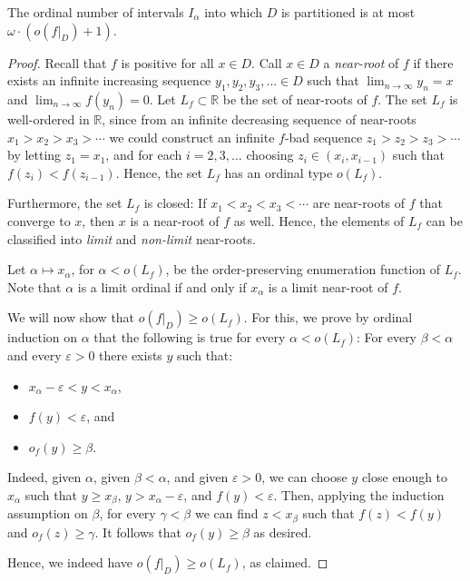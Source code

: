 \documentclass[10pt,a4paper]{amsart}
\begin{document}
\begin{Lemma}\label{lem_num_intervals}
    The ordinal number of intervals $I_\alpha$ into which $D$ is partitioned is at most $\omega\cdot(o(f|_D)+1)$.
\end{Lemma}

\begin{proof}
Recall that $f$ is positive for all $x\in D$. Call $x\in D$ a \emph{near-root} of $f$ if there exists an infinite increasing sequence $y_1,y_2,y_3,\ldots\in D$ such that $\lim_{n\to\infty} y_n = x$ and $\lim_{n\to\infty} f(y_n) = 0$. Let $L_f\subset \mathbb R$ be the set of near-roots of $f$. The set $L_f$ is well-ordered in $\mathbb R$, since from an infinite decreasing sequence of near-roots $x_1>x_2>x_3>\cdots$ we could construct an infinite $f$-bad sequence $z_1>z_2>z_3>\cdots$ by letting $z_1=x_1$, and for each $i=2,3,\ldots$ choosing $z_i\in(x_i,x_{i-1})$ such that $f(z_i)<f(z_{i-1})$. Hence, the set $L_f$ has an ordinal type $o(L_f)$.

Furthermore, the set $L_f$ is closed: If $x_1<x_2<x_3<\cdots$ are near-roots of $f$ that converge to $x$, then $x$ is a near-root of $f$ as well. Hence, the elements of $L_f$ can be classified into \emph{limit} and \emph{non-limit} near-roots. 

Let $\alpha\mapsto x_\alpha$, for $\alpha<o(L_f)$, be the order-preserving enumeration function of $L_f$. Note that $\alpha$ is a limit ordinal if and only if $x_\alpha$ is a limit near-root of $f$.

We will now show that $o(f|_D)\ge o(L_f)$.
For this, we prove by ordinal induction on $\alpha$ that the following is true for every $\alpha<o(L_f)$: For every $\beta<\alpha$ and every $\varepsilon>0$ there exists $y$ such that:
\begin{itemize}
    \item $x_\alpha-\varepsilon<y<x_\alpha$,
    \item $f(y)<\varepsilon$, and
    \item $o_f(y)\ge \beta$.
\end{itemize}
Indeed, given $\alpha$, given $\beta<\alpha$, and given $\varepsilon>0$, we can choose $y$ close enough to $x_\alpha$ such that $y\ge x_\beta$, $y>x_\alpha-\varepsilon$, and $f(y)<\varepsilon$. Then, applying the induction assumption on $\beta$, for every $\gamma<\beta$ we can find $z<x_\beta$ such that $f(z)<f(y)$ and $o_f(z)\ge \gamma$. It follows that $o_f(y)\ge \beta$ as desired.

Hence, we indeed have $o(f|_D)\ge o(L_f)$, as claimed.


\end{proof}
\end{document}
